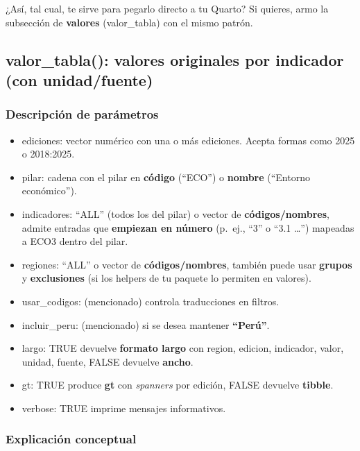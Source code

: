 \documentclass[
  11pt,
  letterpaper,
  DIV=11,
  numbers=noendperiod]{scrartcl}
\begin{document}
¿Así, tal cual, te sirve para pegarlo directo a tu Quarto? Si quieres,
armo la subsección de \textbf{valores} (valor\_tabla) con el mismo
patrón.

\subsection{\texorpdfstring{\textbf{valor\_tabla(): valores originales
por indicador (con
unidad/fuente)}}{valor\_tabla(): valores originales por indicador (con unidad/fuente)}}\label{valor_tabla-valores-originales-por-indicador-con-unidadfuente}

\subsubsection{\texorpdfstring{\textbf{Descripción de
parámetros}}{Descripción de parámetros}}\label{descripciuxf3n-de-paruxe1metros-1}

\begin{itemize}
\item
  ediciones: vector numérico con una o más ediciones. Acepta formas como
  2025 o 2018:2025.
\item
  pilar: cadena con el pilar en \textbf{código} (``ECO'') o
  \textbf{nombre} (``Entorno económico'').
\item
  indicadores: ``ALL'' (todos los del pilar) o vector de
  \textbf{códigos/nombres}, admite entradas que \textbf{empiezan en
  número} (p.~ej., ``3'' o ``3.1 \ldots{}'') mapeadas a ECO3 dentro del
  pilar.
\item
  regiones: ``ALL'' o vector de \textbf{códigos/nombres}, también puede
  usar \textbf{grupos} y \textbf{exclusiones} (si los helpers de tu
  paquete lo permiten en valores).
\item
  usar\_codigos: (mencionado) controla traducciones en filtros.
\item
  incluir\_peru: (mencionado) si se desea mantener \textbf{``Perú''}.
\item
  largo: TRUE devuelve \textbf{formato largo} con region, edicion,
  indicador, valor, unidad, fuente, FALSE devuelve \textbf{ancho}.
\item
  gt: TRUE produce \textbf{gt} con \emph{spanners} por edición, FALSE
  devuelve \textbf{tibble}.
\item
  verbose: TRUE imprime mensajes informativos.
\end{itemize}

\subsubsection{\texorpdfstring{\textbf{Explicación
conceptual}}{Explicación conceptual}}\label{explicaciuxf3n-conceptual-10}
\end{document}
